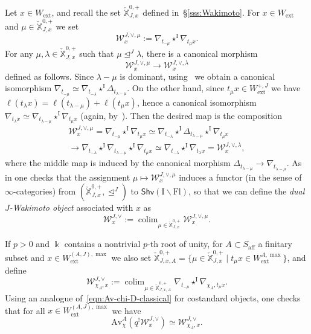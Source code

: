 \documentclass[11pt]{amsart}
\numberwithin{equation}{section}
\theoremstyle{plain}
\theoremstyle{definition}
\newcommand{\I}{{\mathrm I}}
\renewcommand{\k}{\Bbbk}
\newcommand{\sW}{{\mathcal W}}
\newcommand{\X}{{\mathbb X}}
\newcommand{\Xd}{\check{\X}}
\newcommand{\Av}{\mathrm{Av}}
\newcommand{\ex}{\mathrm{ext}}
\newcommand{\af}{\mathrm{aff}}
\newcommand{\Shv}{\mathsf{Shv}}
\newcommand{\Fl}{\mathrm{Fl}}
\DeclareMathOperator*{\colim}{colim}
\begin{document}
Let $x\in W_\ex$, and recall the set $\Xd_{J,x}^{0,+}$ defined in~\S\ref{sss:Wakimoto}.
For $x\in W_\ex$ and $\mu\in \Xd_{J,x}^{0,+}$ we set 
\[
\sW^{J,\vee,\mu}_x:=\nabla_{t_{-\mu}} \star^{\I} \nabla_{t_\mu x} . 
\]
For any $\mu, \lambda\in \Xd_{J,x}^{0,+}$ such that $\mu \unlhd^J \lambda$, there is a canonical morphism 
\[
\sW^{J,\vee,\mu}_x \rightarrow \sW^{J,\vee,\lambda}_x 
\]
defined as follows. Since $\lambda-\mu$ is dominant, using~\cite[Lemma~4.1]{adr} we obtain a canonical isomorphism $\nabla_{t_{-\mu}} \simeq \nabla_{t_{-\lambda}} \star^{\I} \Delta_{t_{\lambda-\mu}}$. On the other hand, since $t_\mu x \in W_\ex^{+,J}$ we have $\ell(t_\lambda x) = \ell(t_{\lambda-\mu}) + \ell(t_\mu x)$, hence a canonical isomorphism $\nabla_{t_\lambda x} \simeq \nabla_{t_{\lambda-\mu}} \star^{\I} \nabla_{t_\mu x}$ (again, by~\cite[Lemma~4.1]{adr}). Then the desired map is the composition
\begin{multline*}
\sW^{J,\vee,\mu}_x 
=\nabla_{t_{-\mu}} \star^{\I} \nabla_{t_\mu x} 
\simeq  \nabla_{t_{-\lambda}} \star^{\I} \Delta_{t_{\lambda-\mu}} \star^{\I} \nabla_{t_\mu x} \\ 
\rightarrow  \nabla_{t_{-\lambda}} \star^{\I} \nabla_{t_{\lambda-\mu}} \star^{\I} \nabla_{t_\mu x}
\simeq \nabla_{t_{-\lambda}} \star^{\I} \nabla_{t_\lambda x} 
=\sW^{J,\vee,\lambda}_x ,
\end{multline*}
where the middle map is induced by the canonical morphism $\Delta_{t_{\lambda-\mu}}\rightarrow \nabla_{t_{\lambda-\mu}}$. 
As in \cite[Lemma 4.5]{adr} one checks that the assignment $\mu \mapsto \sW^{J,\vee,\mu}_x$ induces a functor (in the sense of $\infty$-categories) from $(\Xd_{J,x}^{0,+}, \unlhd^J)$ to $\Shv(\I \backslash \Fl)$, so that we can define
the \emph{dual $J$-Wakimoto object} associated with $x$ as
\[
\sW^{J,\vee}_x:= \colim_{\mu\in \Xd_{J,x}^{0,+}} \sW^{J,\vee,\mu}_x .
\]

If $p>0$ and $\k$ contains a nontrivial $p$-th root of unity, for $A \subset S_\af$ a finitary subset and $x \in W_\ex^{(A,J),\max}$ we also set $\Xd^{0,+}_{J,x,A} = \{ \mu \in \Xd^{0,+}_{J,x} \mid t_\mu x \in W_\ex^{A, \max}\}$, and define
\[
\sW^{J,\vee}_{\chi_A,x} := \colim_{\mu\in \Xd_{J,x,A}^{0,+}} \nabla_{t_{-\mu}} \star^{\I} \nabla_{\chi_A,t_\mu x}.
\]
Using an analogue of~\eqref{eqn:Av-chi-D-classical} for costandard objects, one checks that for all $x \in W_\ex^{(A,J),\max}$ we have
\begin{equation}
\label{eqn:Av-dual-Waki}
\Av^A_\chi(q^! \sW^{J,\vee}_x) \simeq \sW^{J,\vee}_{\chi_A,x}.
\end{equation}
\end{document}
